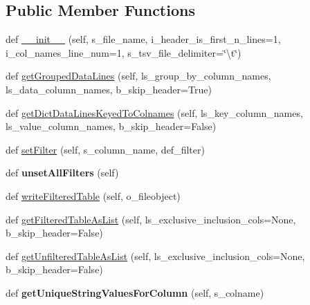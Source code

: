 \subsection*{Public Member Functions}
\begin{DoxyCompactItemize}
\item 
def \hyperlink{classnegui_1_1pgneestimationtablefilemanager_1_1NeEstimationTableFileManager_a19f0658f3fea4aa9decee6e1d39bf17f}{\+\_\+\+\_\+init\+\_\+\+\_\+} (self, s\+\_\+file\+\_\+name, i\+\_\+header\+\_\+is\+\_\+first\+\_\+n\+\_\+lines=1, i\+\_\+col\+\_\+names\+\_\+line\+\_\+num=1, s\+\_\+tsv\+\_\+file\+\_\+delimiter=\char`\"{}\textbackslash{}t\char`\"{})
\item 
def \hyperlink{classnegui_1_1pgneestimationtablefilemanager_1_1NeEstimationTableFileManager_acf9ffeeac295297491110d7999e1e7de}{get\+Grouped\+Data\+Lines} (self, ls\+\_\+group\+\_\+by\+\_\+column\+\_\+names, ls\+\_\+data\+\_\+column\+\_\+names, b\+\_\+skip\+\_\+header=True)
\item 
def \hyperlink{classnegui_1_1pgneestimationtablefilemanager_1_1NeEstimationTableFileManager_ac7f94d9547c7ccc7138d74d14c5623eb}{get\+Dict\+Data\+Lines\+Keyed\+To\+Colnames} (self, ls\+\_\+key\+\_\+column\+\_\+names, ls\+\_\+value\+\_\+column\+\_\+names, b\+\_\+skip\+\_\+header=False)
\item 
def \hyperlink{classnegui_1_1pgneestimationtablefilemanager_1_1NeEstimationTableFileManager_a462d00e75c4a2d24909a90282b4e33e8}{set\+Filter} (self, s\+\_\+column\+\_\+name, def\+\_\+filter)
\item 
def {\bfseries unset\+All\+Filters} (self)\hypertarget{classnegui_1_1pgneestimationtablefilemanager_1_1NeEstimationTableFileManager_a5b17446f982ba441080fa6f8e06625e8}{}\label{classnegui_1_1pgneestimationtablefilemanager_1_1NeEstimationTableFileManager_a5b17446f982ba441080fa6f8e06625e8}

\item 
def \hyperlink{classnegui_1_1pgneestimationtablefilemanager_1_1NeEstimationTableFileManager_abc03906aaa189f497fcfe6d2a32f8e36}{write\+Filtered\+Table} (self, o\+\_\+fileobject)
\item 
def \hyperlink{classnegui_1_1pgneestimationtablefilemanager_1_1NeEstimationTableFileManager_adb06c0cd0ae4870590638905c8ea05a9}{get\+Filtered\+Table\+As\+List} (self, ls\+\_\+exclusive\+\_\+inclusion\+\_\+cols=None, b\+\_\+skip\+\_\+header=False)
\item 
def \hyperlink{classnegui_1_1pgneestimationtablefilemanager_1_1NeEstimationTableFileManager_ad03d8c1689963627115bfa2dbfc2674b}{get\+Unfiltered\+Table\+As\+List} (self, ls\+\_\+exclusive\+\_\+inclusion\+\_\+cols=None, b\+\_\+skip\+\_\+header=False)
\item 
def {\bfseries get\+Unique\+String\+Values\+For\+Column} (self, s\+\_\+colname)\hypertarget{classnegui_1_1pgneestimationtablefilemanager_1_1NeEstimationTableFileManager_a97f8cce6280663acc8ab66285961dfd7}{}\label{classnegui_1_1pgneestimationtablefilemanager_1_1NeEstimationTableFileManager_a97f8cce6280663acc8ab66285961dfd7}


\end{DoxyCompactItemize}
